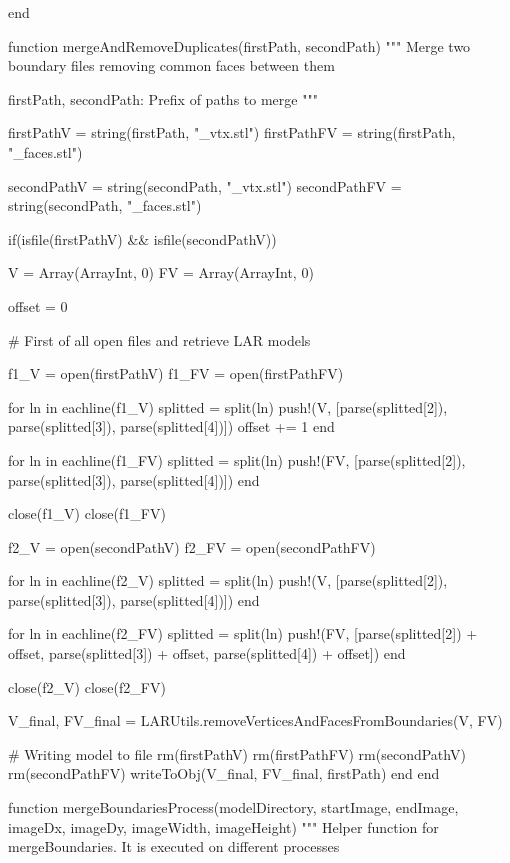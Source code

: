 \documentclass[11pt,oneside]{article}	%
\begin{document}
{end

function mergeAndRemoveDuplicates(firstPath, secondPath)
  """
  Merge two boundary files removing common faces between
  them

  firstPath, secondPath: Prefix of paths to merge
  """

  firstPathV = string(firstPath, "_vtx.stl")
  firstPathFV = string(firstPath, "_faces.stl")

  secondPathV = string(secondPath, "_vtx.stl")
  secondPathFV = string(secondPath, "_faces.stl")

  if(isfile(firstPathV) && isfile(secondPathV))

    V = Array(Array{Int}, 0)
    FV = Array(Array{Int}, 0)

    offset = 0

    # First of all open files and retrieve LAR models

    f1_V = open(firstPathV)
    f1_FV = open(firstPathFV)

    for ln in eachline(f1_V)
      splitted = split(ln)
      push!(V, [parse(splitted[2]), parse(splitted[3]), parse(splitted[4])])
      offset += 1
    end

    for ln in eachline(f1_FV)
      splitted = split(ln)
      push!(FV, [parse(splitted[2]), parse(splitted[3]), parse(splitted[4])])
    end

    close(f1_V)
    close(f1_FV)

    f2_V = open(secondPathV)
    f2_FV = open(secondPathFV)

    for ln in eachline(f2_V)
      splitted = split(ln)
      push!(V, [parse(splitted[2]), parse(splitted[3]), parse(splitted[4])])
    end

    for ln in eachline(f2_FV)
      splitted = split(ln)
      push!(FV, [parse(splitted[2]) + offset, parse(splitted[3]) + offset, parse(splitted[4]) + offset])
    end

    close(f2_V)
    close(f2_FV)

    V_final, FV_final = LARUtils.removeVerticesAndFacesFromBoundaries(V, FV)

    # Writing model to file
    rm(firstPathV)
    rm(firstPathFV)
    rm(secondPathV)
    rm(secondPathFV)
    writeToObj(V_final, FV_final, firstPath)
  end
end

function mergeBoundariesProcess(modelDirectory, startImage, endImage,
                                imageDx, imageDy,
                                imageWidth, imageHeight)
  """
  Helper function for mergeBoundaries.
  It is executed on different processes
  
}
\end{document}
